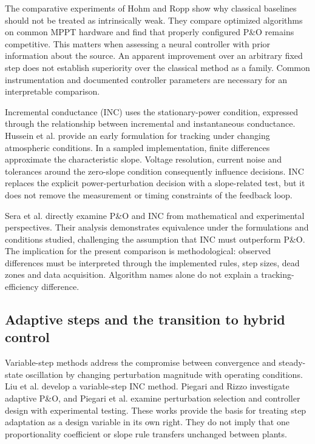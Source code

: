 \documentclass[Acad.Energy.,researcharticle,9pt,twoside,oneauthor]{Definitions/jams_academia}
\begin{document}
The comparative experiments of Hohm and Ropp \cite{hohm} show why classical baselines should not be treated as intrinsically weak. They compare optimized algorithms on common MPPT hardware and find that properly configured P\&O remains competitive. This matters when assessing a neural controller with prior information about the source. An apparent improvement over an arbitrary fixed step does not establish superiority over the classical method as a family. Common instrumentation and documented controller parameters are necessary for an interpretable comparison.

Incremental conductance (INC) uses the stationary-power condition, expressed through the relationship between incremental and instantaneous conductance. Hussein et al. \cite{hussein} provide an early formulation for tracking under changing atmospheric conditions. In a sampled implementation, finite differences approximate the characteristic slope. Voltage resolution, current noise and tolerances around the zero-slope condition consequently influence decisions. INC replaces the explicit power-perturbation decision with a slope-related test, but it does not remove the measurement or timing constraints of the feedback loop.

Sera et al. \cite{sera} directly examine P\&O and INC from mathematical and experimental perspectives. Their analysis demonstrates equivalence under the formulations and conditions studied, challenging the assumption that INC must outperform P\&O. The implication for the present comparison is methodological: observed differences must be interpreted through the implemented rules, step sizes, dead zones and data acquisition. Algorithm names alone do not explain a tracking-efficiency difference.

\subsection{Adaptive steps and the transition to hybrid control}
Variable-step methods address the compromise between convergence and steady-state oscillation by changing perturbation magnitude with operating conditions. Liu et al. \cite{liu} develop a variable-step INC method. Piegari and Rizzo \cite{adaptive} investigate adaptive P\&O, and Piegari et al. \cite{adaptive2015} examine perturbation selection and controller design with experimental testing. These works provide the basis for treating step adaptation as a design variable in its own right. They do not imply that one proportionality coefficient or slope rule transfers unchanged between plants.
\end{document}
